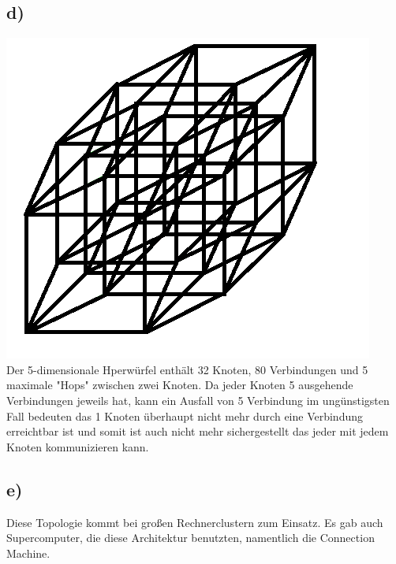 \documentclass[a4paper,12pt]{scrartcl}
\begin{document}
\subsection{d)}
\includegraphics{./images/Blatt-4-Aufgabe17d}\\
Der 5-dimensionale Hperwürfel enthält 32 Knoten, 80 Verbindungen und 5 maximale "Hops" zwischen zwei Knoten. Da jeder Knoten 5 ausgehende Verbindungen jeweils hat, kann ein Ausfall von 5 Verbindung im ungünstigsten Fall bedeuten das 1 Knoten überhaupt nicht mehr durch eine Verbindung erreichtbar ist und somit ist auch nicht mehr sichergestellt das jeder mit jedem Knoten kommunizieren kann.

\subsection{e)}
Diese Topologie kommt bei großen Rechnerclustern zum Einsatz. Es gab auch
Supercomputer, die diese Architektur benutzten, namentlich die Connection
Machine.
\end{document}

